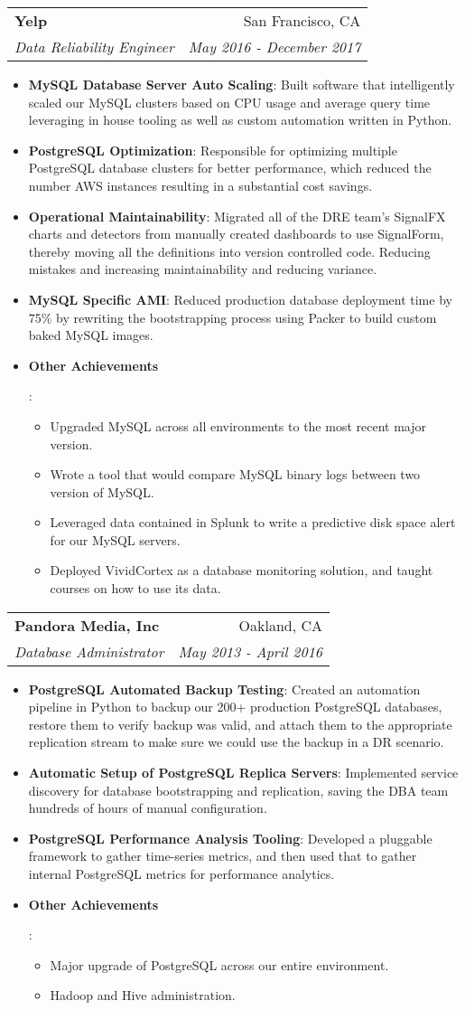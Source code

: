 \documentclass[letterpaper,11pt]{article}
\makeatletter
\newcommand{\resumeItem}[2]{
  \item\small{
    \textbf{#1}{: #2 \vspace{-2pt}}
  }
}
\newcommand{\resumeSubheading}[4]{
  \vspace{-1pt}\item
    \begin{tabular*}{0.97\textwidth}{l@{\extracolsep{\fill}}r}
      \textbf{#1} & #2 \\
      \textit{\small#3} & \textit{\small #4} \\
    \end{tabular*}\vspace{-5pt}
}
\newcommand{\resumeItemListStart}{\begin{itemize}}
\newcommand{\resumeItemListEnd}{\end{itemize}\vspace{-5pt}}
\makeatother
\begin{document}
    \resumeSubheading
      {Yelp}{San Francisco, CA}
      {Data Reliability Engineer}{May 2016 - December 2017}
      \resumeItemListStart
        \resumeItem{MySQL Database Server Auto Scaling}
          {Built software that intelligently scaled our MySQL clusters based on CPU usage and average query time leveraging in house tooling as well as custom automation written in Python.}
        \resumeItem{PostgreSQL Optimization}
          {Responsible for optimizing multiple PostgreSQL database clusters for better performance, which reduced the number AWS instances resulting in a substantial cost savings.}
        \resumeItem{Operational Maintainability}
          {Migrated all of the DRE team's SignalFX charts and detectors from manually created dashboards to use SignalForm, thereby moving all the definitions into version controlled code. Reducing mistakes and increasing maintainability and reducing variance.}
        \resumeItem{MySQL Specific AMI}
          {Reduced production database deployment time by 75\% by rewriting the bootstrapping process using Packer to build custom baked MySQL images.}
        \resumeItem{Other Achievements}
          {
            \begin{itemize}[noitemsep]
            \item Upgraded MySQL across all environments to the most recent major version.
            \item Wrote a tool that would compare MySQL binary logs between two version of MySQL.
            \item Leveraged data contained in Splunk to write a predictive disk space alert for our MySQL servers.
            \item Deployed VividCortex as a database monitoring solution, and taught courses on how to use its data.
            \end{itemize}
          }
      \resumeItemListEnd

    \resumeSubheading
      {Pandora Media, Inc}{Oakland, CA}
      {Database Administrator}{May 2013 - April 2016}
      \resumeItemListStart
        \resumeItem{PostgreSQL Automated Backup Testing}
          {Created an automation pipeline in Python to backup our 200+ production PostgreSQL databases, restore them to verify backup was valid, and attach them to the appropriate replication stream to make sure we could use the backup in a DR scenario.}
        \resumeItem{Automatic Setup of PostgreSQL Replica Servers}
          {Implemented service discovery for database bootstrapping and replication, saving the DBA team hundreds of hours of manual configuration.}
        \resumeItem{PostgreSQL Performance Analysis Tooling}
          {Developed a pluggable framework to gather time-series metrics, and then used that to gather internal PostgreSQL metrics for performance analytics.}
        \resumeItem{Other Achievements}
          {
            \begin{itemize}[noitemsep]
            \item Major upgrade of PostgreSQL across our entire environment.
            \item Hadoop and Hive administration.
            \end{itemize}
          }
      \resumeItemListEnd
\end{document}
